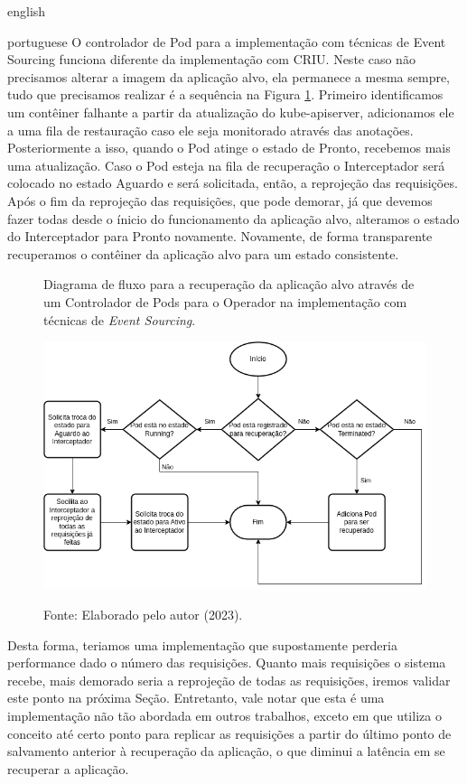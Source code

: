 \begin{otherlanguage*}{english}
\begin{otherlanguage*}{portuguese}
O controlador de Pod para a implementação com técnicas de Event Sourcing funciona
diferente da implementação com CRIU. Neste caso não precisamos alterar a imagem da
aplicação alvo, ela permanece a mesma sempre, tudo que precisamos realizar é a sequência
na Figura \ref{fig:pod-controller-event-sourcing}. Primeiro identificamos um contêiner
falhante a partir da atualização do kube-apiserver, adicionamos ele a uma fila de
restauração caso ele seja monitorado através das anotações. Posteriormente a isso, quando
o Pod atinge o estado de Pronto, recebemos mais uma atualização. Caso o Pod esteja na
fila de recuperação o Interceptador será colocado no estado Aguardo e será solicitada, então, a
reprojeção das requisições. Após o fim da reprojeção das requisições, que pode demorar,
já que devemos fazer todas desde o ínicio do funcionamento da aplicação alvo, alteramos
o estado do Interceptador para Pronto novamente. Novamente, de forma transparente
recuperamos o contêiner da aplicação alvo para um estado consistente.

\begin{figure}[h]
\centering
\caption{Diagrama de fluxo para a recuperação da aplicação alvo através de um Controlador de Pods para o Operador na implementação com técnicas de \textit{Event Sourcing}.}
\includegraphics[scale=0.64]{images/restore-pod.png}
\label{fig:pod-controller-event-sourcing}
\caption*{Fonte: Elaborado pelo autor (2023).}
\end{figure}

Desta forma, teriamos uma implementação que supostamente perderia performance dado
o número das requisições. Quanto mais requisições o sistema recebe, mais demorado seria
a reprojeção de todas as requisições, iremos validar este ponto na próxima Seção.
Entretanto, vale notar que esta é uma implementação não tão abordada em outros trabalhos,
exceto em \cite{muller2022architecture} que utiliza o conceito até certo ponto para
replicar as requisições a partir do último ponto de salvamento anterior à recuperação
da aplicação, o que diminui a latência em se recuperar a aplicação.


\end{otherlanguage*}
\end{otherlanguage*}
